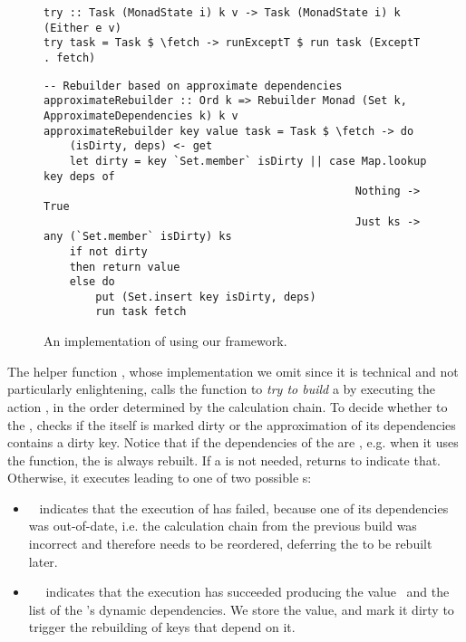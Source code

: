 \begin{figure}
\begin{verbatim}
try :: Task (MonadState i) k v -> Task (MonadState i) k (Either e v)
try task = Task $ \fetch -> runExceptT $ run task (ExceptT . fetch)
\end{verbatim}
\vspace{1mm}
\begin{verbatim}
-- Rebuilder based on approximate dependencies
approximateRebuilder :: Ord k => Rebuilder Monad (Set k, ApproximateDependencies k) k v
approximateRebuilder key value task = Task $ \fetch -> do
    (isDirty, deps) <- get
    let dirty = key `Set.member` isDirty || case Map.lookup key deps of
                                                Nothing -> True
                                                Just ks -> any (`Set.member` isDirty) ks
    if not dirty
    then return value
    else do
        put (Set.insert key isDirty, deps)
        run task fetch
\end{verbatim}
\vspace{-2mm}
\caption{An implementation of \Excel using our framework.}\label{fig-excel-implementation}
\vspace{-2mm}
\end{figure}

The helper function , whose implementation we omit since it is
technical and not particularly enlightening, calls the function  to
\emph{try to build} a  by executing the action , in the order
determined by the calculation chain. To decide whether to  the
,  checks if the  itself is marked dirty or the
approximation of its dependencies contains a dirty key. Notice that if the
dependencies of the  are , e.g. when it uses the
 function, the  is always rebuilt. If a  is
not needed,  returns  to indicate that. Otherwise, it
executes  leading to one of two possible s:

\begin{itemize}
    \item {}~ indicates that the execution of  has
    failed, because one of its dependencies  was out-of-date, i.e. the
    calculation chain from the previous build was incorrect and therefore needs
    to be reordered, deferring the  to be rebuilt later.
    \item {}~~ indicates that the
    execution has succeeded producing the value~ and the list of the
    's dynamic dependencies. We store the value, and mark it dirty to
    trigger the rebuilding of keys that depend on it.
\end{itemize}

